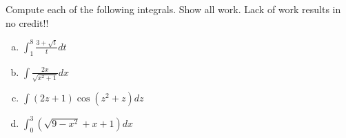 \documentclass[11pt]{exam}
\theoremstyle{definition}
\begin{document}
\begin{questions}
\newpage
\question[10]
Compute each of the following integrals.  Show all work.
Lack of work results in no credit!!
\begin{enumerate}[(a)]
\item $\int_1^8 \frac{3 + \sqrt{t}}{t}dt$
\vspace{2in}
\item $\int\frac{2x}{\sqrt{x^2+1}}dx$
\vspace{2in}
\item $\int (2z+1)\cos(z^2+z)dz$
\vspace{2in}
\item $\int_0^3 (\sqrt{9-x^2} + x + 1)dx$
\end{enumerate}




\end{questions}
\end{document}
